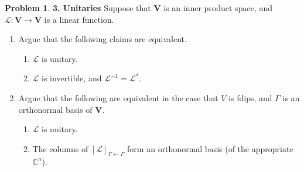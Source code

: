 \documentclass{article}
\theoremstyle{definition}
\newtheorem*{prob*}{Problem}
\newcommand{\V}{\mathbf{V}}
\newcommand{\lag}{\mathcal{L}}
\begin{document}
\begin{prob*}\textbf{3. Unitaries}
	Suppose that $\V$ is an inner product space, and $\lag : \V \to \V$ is a linear function. 
	\begin{enumerate}
		\item Argue that the following claims are equivalent.
		\begin{enumerate}
			\item $\lag$ is unitary.
			\item $\lag$ is invertible, and $\lag^{-1} = \lag^*$.
		\end{enumerate}
	
		\item Argue that the following are equivalent in the case that $V$ is fdips, and $\Gamma$ is an orthonormal basis of $\V$.
		\begin{enumerate}
			\item $\lag$ is unitary.
			\item The columns of $[\lag]_{\Gamma\leftarrow\Gamma}$ form an orthonormal basis (of the appropriate $\mathbb{C}^n$).
		\end{enumerate}
	\end{enumerate}
\end{prob*}





\newpage
\end{document}
